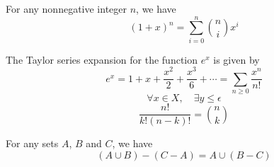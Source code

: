 
\begin{theorem}
For any nonnegative integer $n$, we have
$$(1+x)^n = \sum_{i=0}^n {n \choose i} x^i$$
\end{theorem}
The Taylor series expansion for the function $e^x$ is given by
\begin{equation}
e^x = 1 + x + \frac{x^2}{2} + \frac{x^3}{6} + \cdots = \sum_{n\geq 0} \frac{x^n}{n!}
\end{equation}
\[ \forall x \in X, \quad \exists y \leq \epsilon \]
\[ \frac{n!}{k!(n-k)!} = \binom{n}{k} \]
\begin{theorem}
For any sets $A$, $B$ and $C$, we have
$$ (A\cup B)-(C-A) = A \cup (B-C)$$
\end{theorem}

\blindtext
\blinditemize

\blindtext
\blindenumerate

\blindtext
\blinddescription